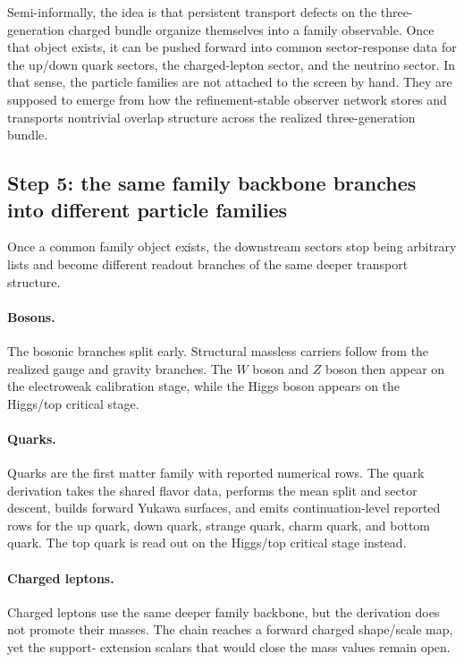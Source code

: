\documentclass[11pt]{article}
\begin{document}
Semi-informally, the idea is that persistent transport defects on the three-generation charged
bundle organize themselves into a family observable. Once that object exists, it can be pushed
forward into common sector-response data for the up/down quark sectors, the charged-lepton
sector, and the neutrino sector. In that sense, the particle families are not attached to the
screen by hand. They are supposed to emerge from how the refinement-stable observer network
stores and transports nontrivial overlap structure across the realized three-generation bundle.

\subsection{Step 5: the same family backbone branches into different particle families}

Once a common family object exists, the downstream sectors stop being arbitrary lists and become
different readout branches of the same deeper transport structure.

\paragraph{Bosons.}
The bosonic branches split early. Structural massless carriers follow from the realized
gauge and gravity branches. The \(W\) boson and \(Z\) boson then appear on the electroweak
calibration stage, while the Higgs boson appears on the Higgs/top critical stage.

\paragraph{Quarks.}
Quarks are the first matter family with reported numerical rows. The quark derivation
takes the shared flavor data, performs the mean split and sector descent, builds forward Yukawa
surfaces, and emits continuation-level reported rows for the up quark, down quark, strange quark,
charm quark, and bottom quark. The top quark is read out on the Higgs/top critical
stage instead.

\paragraph{Charged leptons.}
Charged leptons use the same deeper family backbone, but the derivation does not promote
their masses. The chain reaches a forward charged shape/scale map, yet the support-
extension scalars that would close the mass values remain open.
\end{document}
